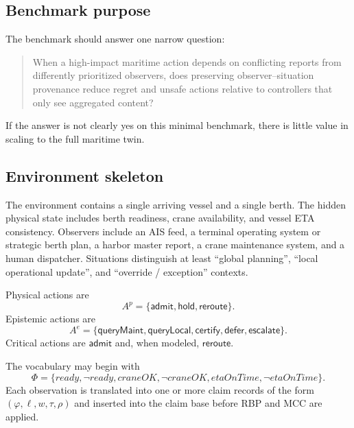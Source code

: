 \documentclass[11pt]{article}
\newcommand{\1}{\mathbf{1}}
\theoremstyle{definition}
\theoremstyle{plain}
\theoremstyle{remark}
\begin{document}
\subsection{Benchmark purpose}

The benchmark should answer one narrow question:

\begin{quote}
When a high-impact maritime action depends on conflicting reports from differently prioritized observers, does preserving observer--situation provenance reduce regret and unsafe actions relative to controllers that only see aggregated content?
\end{quote}

If the answer is not clearly yes on this minimal benchmark, there is little value in scaling to the full maritime twin.

\subsection{Environment skeleton}

The environment contains a single arriving vessel and a single berth. The hidden physical state includes berth readiness, crane availability, and vessel ETA consistency. Observers include an AIS feed, a terminal operating system or strategic berth plan, a harbor master report, a crane maintenance system, and a human dispatcher. Situations distinguish at least ``global planning'', ``local operational update'', and ``override / exception'' contexts.

Physical actions are
\[
A^p=\{\mathsf{admit},\mathsf{hold},\mathsf{reroute}\}.
\]
Epistemic actions are
\[
A^e=\{\mathsf{queryMaint},\mathsf{queryLocal},\mathsf{certify},\mathsf{defer},\mathsf{escalate}\}.
\]
Critical actions are $\mathsf{admit}$ and, when modeled, $\mathsf{reroute}$.

The vocabulary may begin with
\[
\Phi=\{ready,\neg ready, craneOK,\neg craneOK, etaOnTime,\neg etaOnTime\}.
\]
Each observation is translated into one or more claim records of the form $(\varphi,\ell,w,\tau,\rho)$ and inserted into the claim base before RBP and MCC are applied.
\end{document}
